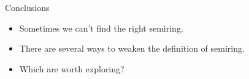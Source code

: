 \documentclass[fleqn]{beamer}
\begin{document}
%

\begin{frame}{Conclusions}
  \begin{itemize}
    \item Sometimes we can't find the right semiring.
    \item There are several ways to weaken the definition of semiring.
    \item Which are worth exploring?
  \end{itemize}
\end{frame}
\end{document}
